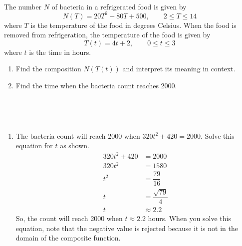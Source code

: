 \begin{example} \cite{ci}~\\
    The number $N$ of bacteria in a refrigerated food is given by
    $$N(T)=20T^2-80T+500, \qquad 2\leq T \leq 14$$
    where $T$ is the temperature of the food in degrees Celsius. When the food is removed from refrigeration, the temperature of the food is given by
    $$T(t)=4t+2, \qquad 0\leq t\leq 3$$
    where $t$ is the time in hours.
    \begin{enumerate}
        \item Find the composition $N(T(t))$ and interpret its meaning in context.
        \item Find the time when the bacteria count reaches 2000.
    \end{enumerate}
    ~\\
    \begin{solution}~\\
        \begin{enumerate}
            \Item \begin{align*}
                N(T(t)) 
                &= 20(4t+2)^2-80(4t+2)+500\\
                &= 20(16t^2+16t+4)-320t-160+500\\
                &= 320t^2+320t+80-320t-160+500\\
                &= 320t^2+420
            \end{align*}
            The composite function $N(T(t))$ represents the number of bacteria in the food as a function of the amount of time the food has been out of refrigeration.
            \item The bacteria count will reach 2000 when $320t^2+420=2000$. Solve this equation for $t$ as shown.
            \begin{align*}
                320t^2+420 &= 2000\\
                320t^2 &= 1580\\
                t^2 &= \dfrac{79}{16}\\
                t &= \dfrac{\sqrt{79}}{4}\\
                t &\approx 2.2
            \end{align*}
            So, the count will reach 2000 when $t\approx 2.2$ hours.
            When you solve this equation, note that the negative value is rejected because it is not in the domain of the composite function.
        \end{enumerate}
    \end{solution}
\end{example}


